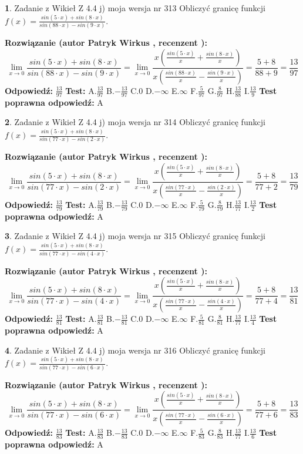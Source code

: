 \documentclass[12pt, a4paper]{article}
\theoremstyle{definition} %
\newtheorem{zad}{}
\newcommand{\zadStart}[1]{\begin{zad}#1\newline}
\newcommand{\zadStop}{\end{zad}}
\newcommand{\rozwStart}[2]{\noindent \textbf{Rozwiązanie (autor #1 , recenzent #2): }\newline}
\newcommand{\rozwStop}{\newline}
\newcommand{\odpStart}{\noindent \textbf{Odpowiedź:}\newline}
\newcommand{\odpStop}{\newline}
\newcommand{\testStart}{\noindent \textbf{Test:}\newline}
\newcommand{\testStop}{\newline}
\newcommand{\kluczStart}{\noindent \textbf{Test poprawna odpowiedź:}\newline}
\newcommand{\kluczStop}{\newline}
\begin{document}
\zadStart{Zadanie z Wikieł Z 4.4 j) moja wersja nr 313}
Obliczyć granicę funkcji $f(x)=\frac{sin(5\cdot x) +sin(8\cdot x)}{sin(88\cdot x) -sin(9\cdot x)}$.
\zadStop
\rozwStart{Patryk Wirkus}{}
$$\lim\limits_{x\to 0}\frac{sin(5\cdot x) +sin(8\cdot x)}{sin(88\cdot x) -sin(9\cdot x)}=\lim\limits_{x\to 0}\frac{x(\frac{sin(5\cdot x)}{x}+\frac{sin(8\cdot x)}{x})}{x(\frac{sin(88\cdot x)}{x}-\frac{sin(9\cdot x)}{x})}=\frac{5+8}{88+9} = \frac{13}{97}$$
\rozwStop
\odpStart
$\frac{13}{97}$
\odpStop
\testStart
A.$\frac{13}{97}$
B.$-\frac{13}{97}$
C.$0$
D.$-\infty$
E.$\infty$
F.$\frac{5}{97}$
G.$\frac{8}{97}$
H.$\frac{13}{88}$
I.$\frac{13}{9}$
\testStop
\kluczStart
A
\kluczStop



\zadStart{Zadanie z Wikieł Z 4.4 j) moja wersja nr 314}
Obliczyć granicę funkcji $f(x)=\frac{sin(5\cdot x) +sin(8\cdot x)}{sin(77\cdot x) -sin(2\cdot x)}$.
\zadStop
\rozwStart{Patryk Wirkus}{}
$$\lim\limits_{x\to 0}\frac{sin(5\cdot x) +sin(8\cdot x)}{sin(77\cdot x) -sin(2\cdot x)}=\lim\limits_{x\to 0}\frac{x(\frac{sin(5\cdot x)}{x}+\frac{sin(8\cdot x)}{x})}{x(\frac{sin(77\cdot x)}{x}-\frac{sin(2\cdot x)}{x})}=\frac{5+8}{77+2} = \frac{13}{79}$$
\rozwStop
\odpStart
$\frac{13}{79}$
\odpStop
\testStart
A.$\frac{13}{79}$
B.$-\frac{13}{79}$
C.$0$
D.$-\infty$
E.$\infty$
F.$\frac{5}{79}$
G.$\frac{8}{79}$
H.$\frac{13}{77}$
I.$\frac{13}{2}$
\testStop
\kluczStart
A
\kluczStop



\zadStart{Zadanie z Wikieł Z 4.4 j) moja wersja nr 315}
Obliczyć granicę funkcji $f(x)=\frac{sin(5\cdot x) +sin(8\cdot x)}{sin(77\cdot x) -sin(4\cdot x)}$.
\zadStop
\rozwStart{Patryk Wirkus}{}
$$\lim\limits_{x\to 0}\frac{sin(5\cdot x) +sin(8\cdot x)}{sin(77\cdot x) -sin(4\cdot x)}=\lim\limits_{x\to 0}\frac{x(\frac{sin(5\cdot x)}{x}+\frac{sin(8\cdot x)}{x})}{x(\frac{sin(77\cdot x)}{x}-\frac{sin(4\cdot x)}{x})}=\frac{5+8}{77+4} = \frac{13}{81}$$
\rozwStop
\odpStart
$\frac{13}{81}$
\odpStop
\testStart
A.$\frac{13}{81}$
B.$-\frac{13}{81}$
C.$0$
D.$-\infty$
E.$\infty$
F.$\frac{5}{81}$
G.$\frac{8}{81}$
H.$\frac{13}{77}$
I.$\frac{13}{4}$
\testStop
\kluczStart
A
\kluczStop



\zadStart{Zadanie z Wikieł Z 4.4 j) moja wersja nr 316}
Obliczyć granicę funkcji $f(x)=\frac{sin(5\cdot x) +sin(8\cdot x)}{sin(77\cdot x) -sin(6\cdot x)}$.
\zadStop
\rozwStart{Patryk Wirkus}{}
$$\lim\limits_{x\to 0}\frac{sin(5\cdot x) +sin(8\cdot x)}{sin(77\cdot x) -sin(6\cdot x)}=\lim\limits_{x\to 0}\frac{x(\frac{sin(5\cdot x)}{x}+\frac{sin(8\cdot x)}{x})}{x(\frac{sin(77\cdot x)}{x}-\frac{sin(6\cdot x)}{x})}=\frac{5+8}{77+6} = \frac{13}{83}$$
\rozwStop
\odpStart
$\frac{13}{83}$
\odpStop
\testStart
A.$\frac{13}{83}$
B.$-\frac{13}{83}$
C.$0$
D.$-\infty$
E.$\infty$
F.$\frac{5}{83}$
G.$\frac{8}{83}$
H.$\frac{13}{77}$
I.$\frac{13}{6}$
\testStop
\kluczStart
A
\kluczStop
\end{document}
